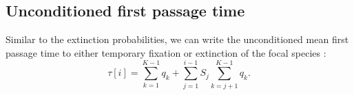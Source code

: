 \subsection*{Unconditioned first passage time}%
Similar to the extinction probabilities, we can write the unconditioned mean first passage time to either temporary fixation or extinction of the focal species \cite{Nisbet1982}:
\begin{equation}
\tau[i] = \sum_{k=1}^{K-1}q_k + \sum_{j=1}^{i-1}S_{j}\sum_{k=j+1}^{K-1}q_k. 
\end{equation}

